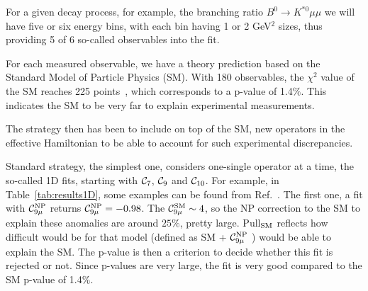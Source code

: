 \documentclass[11pt,amsmath,amssymb]{article}
\newcommand{\Cc}[1]{{\cal C}_{#1}}
\begin{document}
For a given decay process, for example, the branching ratio $B^0 \to K^{*0} \mu\mu$ we will have five or six energy bins,
with each bin having 1 or 2 GeV$^2$ sizes, thus providing 5 of 6 so-called observables into the fit.

For each measured observable, we have a theory prediction based on the Standard Model of Particle Physics (SM).
With 180 observables, the $\chi^2$ value of the SM reaches 225 points~\cite{Alguero:2019ptt}, which corresponds
to a p-value of 1.4$\%$. This indicates the SM to be very far to explain experimental measurements.

The strategy then has been to include on top of the SM, new operators in the effective Hamiltonian to be able
to account for such experimental discrepancies.

Standard strategy, the simplest one, considers one-single operator at a time, the so-called 1D fits, starting with ${\cal C}_7$,
${\cal C}_9$ and ${\cal C}_{10}$. For example, in Table~\ref{tab:results1D}, some examples can be found from Ref.~\cite{Alguero:2019ptt}.
The first one, a fit with $\Cc{9\mu}^{\rm NP}$ returns $\Cc{9\mu}^{\rm NP} = -0.98$. The $\Cc{9\mu}^{\rm SM} \sim 4$, so 
the NP correction to the SM to explain these anomalies are around $25\%$, pretty large. Pull$_{\rm SM}$ reflects how difficult
would be for that model (defined as SM + $\Cc{9\mu}^{\rm NP}$ ) would be able to explain the SM. The p-value is then a criterion
to decide whether this fit is rejected or not. Since p-values are very large, the fit is very good compared to the SM p-value of 1.4$\%$.
 
\end{document}
